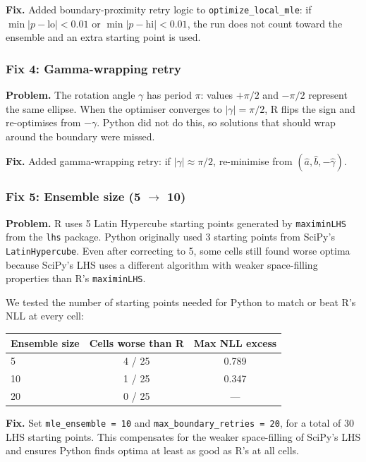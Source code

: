 \documentclass[12pt,a4paper]{article}
\begin{document}
\textbf{Fix.}
Added boundary-proximity retry logic to
\texttt{optimize\_local\_mle}: if $\min|p - \text{lo}| < 0.01$ or
$\min|p - \text{hi}| < 0.01$, the run does not count toward the
ensemble and an extra starting point is used.

\subsubsection{Fix 4: Gamma-wrapping retry}

\textbf{Problem.}
The rotation angle $\gamma$ has period $\pi$: values
$+\pi/2$ and $-\pi/2$ represent the same ellipse.  When the
optimiser converges to $|\gamma| = \pi/2$, R flips the sign and
re-optimises from $-\gamma$.  Python did not do this, so solutions
that should wrap around the boundary were missed.

\textbf{Fix.}
Added gamma-wrapping retry: if $|\gamma| \approx \pi/2$,
re-minimise from $(\hat{a}, \hat{b}, -\hat{\gamma})$.

\subsubsection{Fix 5: Ensemble size (5 $\to$ 10)}

\textbf{Problem.}
R uses 5 Latin Hypercube starting points generated by
\texttt{maximinLHS} from the \texttt{lhs} package.  Python
originally used 3 starting points from SciPy's
\texttt{LatinHypercube}.  Even after correcting to 5, some cells
still found worse optima because SciPy's LHS uses a different
algorithm with weaker space-filling properties than R's
\texttt{maximinLHS}.

We tested the number of starting points needed for Python to match
or beat R's NLL at every cell:

\begin{center}
\begin{tabular}{lcc}
\toprule
Ensemble size & Cells worse than R & Max NLL excess \\
\midrule
5  & 4 / 25 & 0.789 \\
10 & 1 / 25 & 0.347 \\
20 & 0 / 25 & --- \\
\bottomrule
\end{tabular}
\end{center}

\textbf{Fix.}
Set \texttt{mle\_ensemble = 10} and
\texttt{max\_boundary\_retries = 20}, for a total of 30 LHS
starting points.  This compensates for the weaker space-filling
of SciPy's LHS and ensures Python finds optima at least as good
as R's at all cells.
\end{document}
